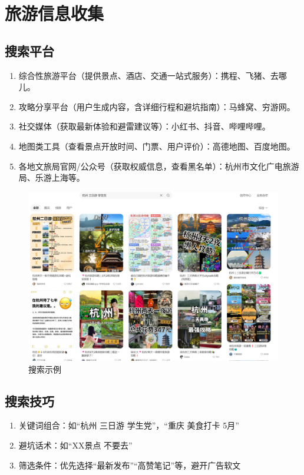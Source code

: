 \documentclass{amznotes}
\begin{document}
\section{旅游信息收集}
\subsection{搜索平台}
\begin{enumerate}
  \item 综合性旅游平台（提供景点、酒店、交通一站式服务）：携程、飞猪、去哪儿。
  \item 攻略分享平台（用户生成内容，含详细行程和避坑指南）：马蜂窝、穷游网。
  \item 社交媒体（获取最新体验和避雷建议等）：小红书、抖音、哔哩哔哩。
  \item 地图类工具（查看景点开放时间、门票、用户评价）：高德地图、百度地图。
  \item 各地文旅局官网/公众号（获取权威信息，查看黑名单）：杭州市文化广电旅游局、乐游上海等。
\end{enumerate}
\begin{figure}[H]
\centering
\includegraphics[width=.8\textwidth]{./figures/生活/示例1.png}
\caption{搜索示例}
\end{figure}
\subsection{搜索技巧}
\begin{enumerate}
  \item 关键词组合：如“杭州 三日游 学生党”，“重庆 美食打卡 5月”
  \item 避坑话术：如“XX景点 不要去”
  \item 筛选条件：优先选择“最新发布”“高赞笔记”等，避开广告软文
\end{enumerate}
\end{document}
